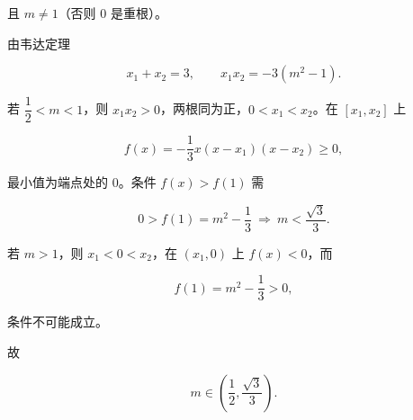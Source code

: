 \begin{answer}
且 $m\ne1$（否则 $0$ 是重根）。

由韦达定理

\nopagebreak[4]
\[x_1+x_2=3,\qquad x_1x_2=-3(m^2-1).\]

若 $\dfrac12<m<1$，则 $x_1x_2>0$，两根同为正，$0<x_1<x_2$。在 $[x_1,x_2]$ 上

\nopagebreak[4]
\[f(x)=-\frac13x(x-x_1)(x-x_2)\geqslant0,\]

最小值为端点处的 $0$。条件 $f(x)>f(1)$ 需

\nopagebreak[4]
\[0>f(1)=m^2-\frac13\ \Longrightarrow\ m<\frac{\sqrt3}{3}.\]

若 $m>1$，则 $x_1<0<x_2$，在 $(x_1,0)$ 上 $f(x)<0$，而

\nopagebreak[4]
\[f(1)=m^2-\frac13>0,\]

条件不可能成立。

故

\nopagebreak[4]
\[m\in\left(\frac12,\frac{\sqrt3}{3}\right).\]


\end{answer}
